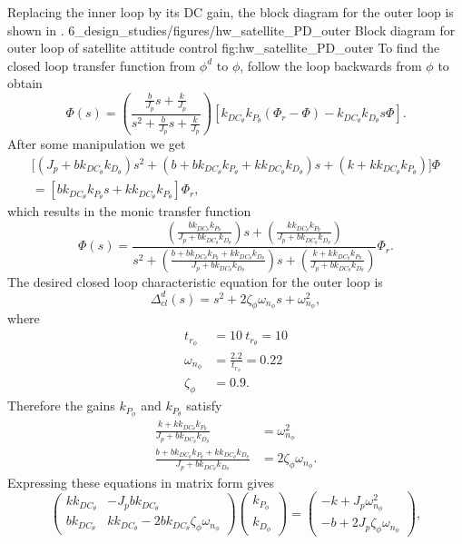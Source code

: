 Replacing the inner loop by its DC gain, the block diagram for the outer loop is shown in .
	{6_design_studies/figures/hw_satellite_PD_outer}
	{Block diagram for outer loop of satellite attitude control}
	{fig:hw_satellite_PD_outer}
To find the closed loop transfer function from $\phi^d$ to $\phi$, follow the loop backwards from $\phi$ to obtain
\[
\Phi(s) = \left(\frac{\frac{b}{J_p}s+\frac{k}{J_p}}{s^2+\frac{b}{J_p}s+\frac{k}{J_p}}\right)\left[k_{DC_\theta}k_{P_\theta}(\Phi_r-\Phi)-k_{DC_\theta}k_{D_\theta}s\Phi\right].
\]
After some manipulation we get
\begin{multline}
\big[(J_p+bk_{DC_\theta}k_{D_\theta})s^2 + (b+bk_{DC_\theta}k_{P_\theta}+kk_{DC_\theta}k_{D_\theta})s 
	 + (k+kk_{DC_\theta}k_{P_\theta})\big]\Phi \\ = \left[bk_{DC_\theta}k_{P_\theta}s+kk_{DC_\theta}k_{P_\theta}\right]\Phi_r,
\end{multline}
which results in the monic transfer function
\[
\Phi(s)=\frac{\left(\frac{bk_{DC_\theta}k_{P_\theta}}{J_p+bk_{DC_\theta}k_{D_\theta}}\right)s+\left(\frac{kk_{DC_\theta}k_{P_\theta}}{J_p+bk_{DC_\theta}k_{D_\theta}}\right)}{s^2 + \left(\frac{b+bk_{DC_\theta}k_{P_\theta}+kk_{DC_\theta}k_{D_\theta}}{J_p+bk_{DC_\theta}k_{D_\theta}}\right)s + \left(\frac{k+kk_{DC_\theta}k_{P_\theta}}{J_p+bk_{DC_\theta}k_{D_\theta}}\right)} \Phi_r.
\]
The desired closed loop characteristic equation for the outer loop is
\[
\Delta_{cl}^d(s) = s^2 + 2\zeta_{\phi}\omega_{n_\phi} s + \omega_{n_\phi}^2,
\]
where
\begin{align*}
t_{r_\phi} &= 10~t_{r_\theta} = 10 \\
\omega_{n_\phi} &= \frac{2.2}{t_{r_\phi}} = 0.22 \\
\zeta_{\phi} &= 0.9.
\end{align*}
Therefore the gains $k_{P_\phi}$ and $k_{P_\theta}$ satisfy
\begin{align*}
\frac{k+kk_{DC_\theta}k_{P_\theta}}{J_p+bk_{DC_\theta}k_{D_\theta}} &= \omega_{n_\phi}^2 \\
\frac{b+bk_{DC_\theta}k_{P_\theta}+kk_{DC_\theta}k_{D_\theta}}{J_p+bk_{DC_\theta}k_{D_\theta}} &= 2\zeta_{\phi}\omega_{n_\phi}.
\end{align*}
Expressing these equations in matrix form gives
\[
\begin{pmatrix} kk_{DC_\theta} & -J_pbk_{DC_\theta} \\ bk_{DC_\theta} & kk_{DC_\theta}-2bk_{DC_\theta}\zeta_\phi\omega_{n_\phi} \end{pmatrix}\begin{pmatrix}k_{P_\phi}\\k_{D_\phi}\end{pmatrix} = \begin{pmatrix} -k + J_p\omega_{n_\phi}^2 \\ -b + 2J_p\zeta_\phi\omega_{n_\phi} \end{pmatrix},
\]
